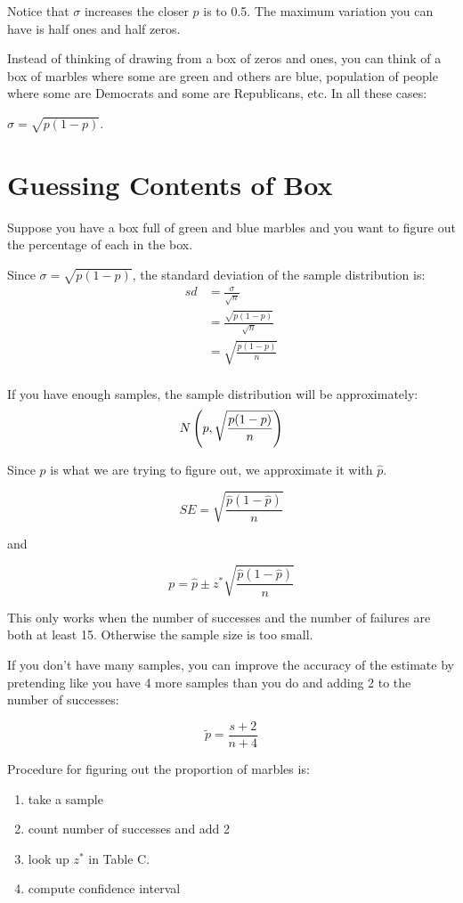 \documentclass[letterpaper, landscape]{exam}
\begin{document}
  Notice that $\sigma$ increases the closer $p$ is to 0.5. The maximum variation you
  can have is half ones and half zeros.

  Instead of thinking of drawing from a box of zeros and ones, you can think of a box
  of marbles where some are green and others are blue, population of people where
  some are Democrats and some are Republicans, etc. In all these cases:

  $\sigma = \sqrt{p(1 - p)}$.

  \section{Guessing Contents of Box} %

  Suppose you have a box full of green and blue marbles and you want to figure out the
  percentage of each in the box.

  Since $\sigma = \sqrt{ p(1 - p) }$, the standard deviation of the sample
  distribution is:
  \begin{align*}
    sd & = \frac{\sigma}{\sqrt{n}} \\
       & = \frac{\sqrt{ p(1 - p) }}{\sqrt{n}} \\
       & = \sqrt{ \frac{p (1 - p)}{n} } \\
  \end{align*}

  If you have enough samples, the sample distribution will be approximately:
  \[
    N \del{ p, \sqrt{ \frac{p (1 - p)}{n} } }
  \]
  
  Since $p$ is what we are trying to figure out, we approximate it with $\hat{p}$.

  \[
    SE = \sqrt{ \frac{ \hat{p}(1 - \hat{p}) }{n} }
  \]

  and

  \[
    p = \hat{p} \pm z^* \sqrt{ \frac{ \hat{p}(1 - \hat{p}) }{n} }
  \]

  This only works when the number of successes and the number of failures are both at
  least 15. Otherwise the sample size is too small.

  If you don't have many samples, you can improve the accuracy of the estimate by
  pretending like you have 4 more samples than you do and adding 2 to the number of
  successes:

  \[
    \tilde{p} = \frac{s + 2}{n + 4}
  \]

  Procedure for figuring out the proportion of marbles is:
  \begin{enumerate}[nosep]
    \item take a sample
    \item count number of successes and add 2
    \item look up $z^*$ in Table C.
    \item compute confidence interval
  \end{enumerate}
\end{document}

